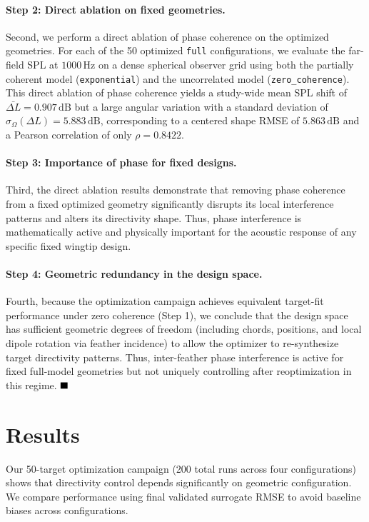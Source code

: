\documentclass[11pt]{article}
\begin{document}
\paragraph{Step 2: Direct ablation on fixed geometries.}
Second, we perform a direct ablation of phase coherence on the optimized geometries. For each of the 50 optimized \texttt{full} configurations, we evaluate the far-field SPL at $1000\,\mathrm{Hz}$ on a dense spherical observer grid using both the partially coherent model (\texttt{exponential}) and the uncorrelated model (\texttt{zero\_coherence}). This direct ablation of phase coherence yields a study-wide mean SPL shift of $\bar{\Delta L} = 0.907\,\mathrm{dB}$ but a large angular variation with a standard deviation of $\sigma_\Omega(\Delta L) = 5.883\,\mathrm{dB}$, corresponding to a centered shape RMSE of $5.863\,\mathrm{dB}$ and a Pearson correlation of only $\rho = 0.8422$.

\paragraph{Step 3: Importance of phase for fixed designs.}
Third, the direct ablation results demonstrate that removing phase coherence from a fixed optimized geometry significantly disrupts its local interference patterns and alters its directivity shape. Thus, phase interference is mathematically active and physically important for the acoustic response of any specific fixed wingtip design.

\paragraph{Step 4: Geometric redundancy in the design space.}
Fourth, because the optimization campaign achieves equivalent target-fit performance under zero coherence (Step 1), we conclude that the design space has sufficient geometric degrees of freedom (including chords, positions, and local dipole rotation via feather incidence) to allow the optimizer to re-synthesize target directivity patterns. Thus, inter-feather phase interference is active for fixed full-model geometries but not uniquely controlling after reoptimization in this regime. $\hfill \blacksquare$

\section{Results}

Our 50-target optimization campaign (200 total runs across four configurations) shows that directivity control depends significantly on geometric configuration. We compare performance using final validated surrogate RMSE to avoid baseline biases across configurations.
\end{document}
